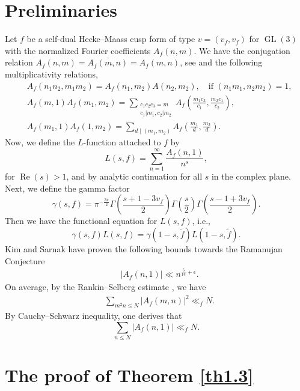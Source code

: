 \documentclass[10pt,leqno]{amsart}
\numberwithin{equation}{section}
\begin{document}
\section{Preliminaries}
Let $f$ be a self-dual Hecke--Maass cusp form of type $v=(v_f,v_f)$ for $\operatorname{GL}(3)$  with  the normalized Fourier coefficients $A_f(n,m)$. We have the conjugation relation $A_f(n,m)=\overline{A_f(m,n)}=A_f(m,n)$, see \cite[Theorem 9.3.11]{MR2254662} and the  following multiplicativity relations,
\[
\begin{aligned}
&A_f\left(n_1 n_2, m_{1} m_{2}\right)=A_f\left(n_1, m_{2}\right)  A\left(n_2, m_{2}\right), \quad \text{if }  \left(n_1 m_{1}, n_2  m_{2}\right)=1,
\\
    &A_f(m, 1) A_f\left(m_1, m_{2}\right)=\sum_{\substack{ c_1c_2c_3=m \\
c_1\left|m_1, c_2\right| m_2}} A_f\left(\frac{m_1 c_3}{c_1}, \frac{m_2 c_1}{c_2}\right) ,\\
    &A_f(m_1, 1) A_f\left(1, m_{2}\right)=\sum_{d\mid (m_1,m_2)} A_f\left(\frac{m_1}{d}, \frac{m_2}{d}\right) .
\end{aligned}
\]
Now, we define the $L$-function attached to $f$ by
\[
L(s, f)=\sum_{n=1}^{\infty} \frac{A_f(n, 1)}{n^s},
\]
for $\operatorname{Re}(s)>1$, and by analytic continuation for all $s$ in the complex plane. Next, we define the gamma factor
\[
\gamma(s, f)=\pi^{-\frac{3\pi}{2}} \Gamma\left(\frac{s+1-3v_f}{2}\right) \Gamma\left(\frac{s}{2}\right) \Gamma\left(\frac{s-1+3v_f}{2}\right) .
\]
Then we have the  functional equation for $L(s, f)$, i.e.,
\[
\gamma(s, f) L(s, f)=\gamma(1-s, \tilde{f}) L(1-s, \tilde{f}) .
\]
Kim and Sarnak \cite[Appendix 2]{MR1937203} have proven the following bounds towards the Ramanujan Conjecture
\[
\begin{aligned}
& \left|A_f(n, 1)\right| \ll n^{\frac{5}{14}+\epsilon}.
\end{aligned}
\]
On average, by the Rankin–Selberg estimate \cite{MR4211098}, we have
\[
\begin{aligned}
& \sum_{m^2n \leqslant N}|A_f(m,n)|^2 \ll_f N.
\end{aligned}
\]
By Cauchy--Schwarz inequality, one derives that
\begin{equation}\label{eq2.1}
    \sum_{n \leqslant N}|A_f(n, 1)| \ll_f N .
\end{equation}


\section{The proof of Theorem \ref{th1.3}}
\end{document}
